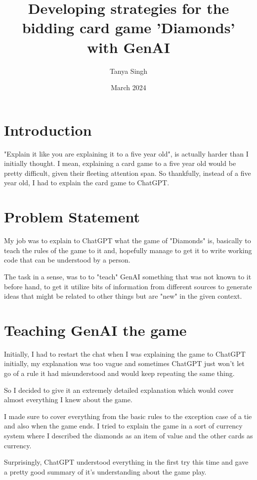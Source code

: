 \documentclass{article}
\title{Developing strategies for the bidding card game 'Diamonds' with GenAI}
\author{Tanya Singh}
\date{March 2024}
\begin{document}
\maketitle

\section{Introduction}
"Explain it like you are explaining it to a five year old", is actually harder than I initially thought. I mean, explaining a card game to a five year old would be pretty difficult, given their fleeting attention span. So thankfully, instead of a five year old, I had to explain the card game to ChatGPT.

\section{Problem Statement}
My job was to explain to ChatGPT what the game of "Diamonds" is, basically to teach the rules of the game to it and, hopefully manage to get it to write working code that can be understood by a person. \newline

The task in a sense, was to to "teach" GenAI something that was not known to it before hand, to get it utilize bits of information from different sources to generate ideas that might be related to other things but are "new" in the given context. 

\section{Teaching GenAI the game}
Initially, I had to restart the chat  when I was explaining the game to ChatGPT initially, my explanation was too vague and sometimes ChatGPT just won't let go of a rule it had misunderstood and would keep repeating the same thing. \newline

So I decided to give it an extremely detailed explanation which would cover almost everything I knew about the game.\newline

I made sure to cover everything from the basic rules to the exception case of a tie and also when the game ends. I tried to explain the game in a sort of currency system where I described the diamonds as an item of value and the other cards as currency. \newline

Surprisingly, ChatGPT understood everything in the first try this time and gave a pretty good summary of it's understanding about the game play.\newline
\end{document}
